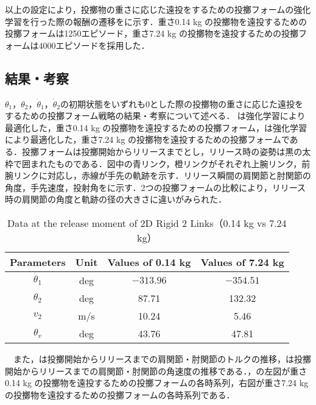 以上の設定により，投擲物の重さに応じた遠投をするための投擲フォームの強化学習を行った際の報酬の遷移をに示す．重さ0.14 kg の投擲物を遠投するための投擲フォームは1250エピソード，重さ7.24 kg の投擲物を遠投するための投擲フォームは4000エピソードを採用した．

\subsection{結果・考察}
$\theta_{1}$，$\theta_{2}$，$\dot{\theta}_{1}$，$\dot{\theta}_{2}$の初期状態をいずれも0とした際の投擲物の重さに応じた遠投をするための投擲フォーム戦略の結果・考察について述べる．
は強化学習により最適化した，重さ0.14 kg の投擲物を遠投するための投擲フォーム，は強化学習により最適化した，重さ7.24 kg の投擲物を遠投するための投擲フォームである．投擲フォームは投擲開始からリリースまでとし，リリース時の姿勢は黒の太枠で囲まれたものである．図中の青リンク，橙リンクがそれぞれ上腕リンク，前腕リンクに対応し，赤線が手先の軌跡を示す．リリース瞬間の肩関節と肘関節の角度，手先速度，投射角をに示す．2つの投擲フォームの比較により，リリース時の肩関節の角度と軌跡の径の大きさに違いがみられた．\\
\begin{table}[tb]
  \begin{center}
    \caption{Data at the release moment of 2D Rigid 2 Links（0.14 kg vs 7.24 kg）}
    \begin{tabular}{c|c|c|c}
      \hline
      Parameters & Unit & Values of 0.14 kg & Values of 7.24 kg \\
      \hline
      $\theta_{1}$ & deg & $-313.96$ & $-354.51$ \\
      $\theta_{2}$ & deg & 87.71 & 132.32 \\
      $v_{2}$ & m/s & 10.24 & 5.46 \\
      $\theta_{v}$ & deg & 43.76 & 47.81 \\
      \hline
    \end{tabular}
  \end{center}
\end{table}
　また，は投擲開始からリリースまでの肩関節・肘関節のトルクの推移，は投擲開始からリリースまでの肩関節・肘関節の角速度の推移である．，の左図が重さ0.14 kg の投擲物を遠投するための投擲フォームの各時系列，右図が重さ7.24 kg の投擲物を遠投するための投擲フォームの各時系列である．\\

